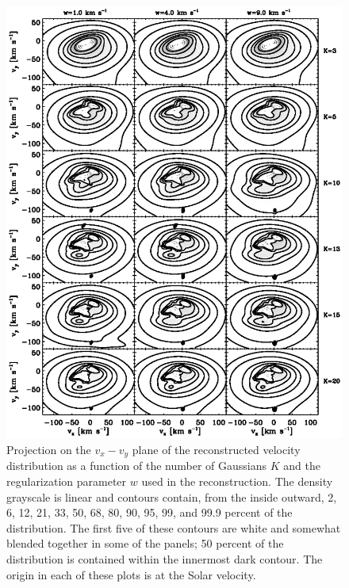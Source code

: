 \clearpage
\begin{figure}
\includegraphics{veldensXY.ps}
\caption{Projection on the $v_x-v_y$ plane of the reconstructed velocity distribution as a function of the number of Gaussians $K$ and the regularization parameter $w$ used in the reconstruction. The density grayscale is linear and contours contain, from the inside outward, 2, 6, 12, 21, 33, 50, 68, 80, 90, 95, 99, and 99.9 percent of the distribution. The first five of these contours are white and somewhat blended together in some of the panels; 50 percent of the distribution is contained within the innermost dark contour. The origin in each of these plots is at the Solar velocity.}%
\label{fig:veldensXY}
\end{figure}


